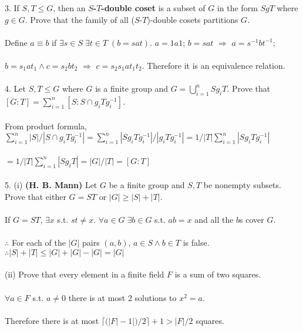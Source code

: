 \documentclass{article}
\begin{document}
\begin{siderules}
\color{blue}3. If \(S,T\le G\), then an \textbf{\(S\)-\(T\)-double coset} is a subset of \(G\) in the form \(SgT\) where \(g\in G\).
Prove that the family of all (\(S\)-\(T\))-double cosets partitions \(G\).\\\\\color{black}
\null\qquad Define \(a\equiv b\) if \(\exists s\in S\;\exists t\in T\;(b=sat)\). \(a=1a1\); \(b=sat\) \(\Longrightarrow\) \(a=s^{-1}bt^{-1}\);\\\\
\null\qquad \(b=s_{1}at_{1}\land c=s_{2}bt_{2}\) \(\Longrightarrow\) \(c=s_{2}s_{1}at_{1}t_{2}\). Therefore it is an equivalence relation.\\\\
\color{blue}4. Let \(S,T\le G\) where \(G\) is a finite group and \(G=\bigcup_{i=1}^{n}Sg_{i}T\). Prove that \([G:T]=\sum_{i=1}^{n}[S:S\cap g_{i}Tg_{i}^{-1}]\).\\\\\color{black}
\null\qquad From product formula, \(\sum_{i=1}^{n}|S|/|S\cap g_{i}Tg_{i}^{-1}|=\sum_{i=1}^{n}|Sg_{i}Tg_{i}^{-1}|/|g_{i}Tg_{i}^{-1}|=1/|T|\sum_{i=1}^{n}|Sg_{i}Tg_{i}^{-1}|\)\\\\
\null\qquad \(=1/|T|\sum_{i=1}^{n}|Sg_{i}T|=|G|/|T|=[G:T]\)\\\\
\color{blue}5. (i) \textbf{(H. B. Mann)} Let \(G\) be a finite group and \(S,T\) be nonempty subsets. Prove that either \(G=ST\) or \(|G|\ge |S|+|T|\).\color{black}\\\\
\null\qquad If \(G=ST\), \(\exists x\) s.t. \(st\neq x\). \(\forall a\in G\;\exists b\in G\) s.t. \(ab=x\) and all the \(b\)s cover \(G\).\\\\
\null\qquad \(\therefore\) For each of the \(|G|\) pairs \((a,b)\), \(a\in S\land b\in T\) is false. \(\therefore |S|+|T|\le|G|+|G|-|G|=|G|\)\\\\
\color{blue}(ii) Prove that every element in a finite field \(F\) is a sum of two squares.\\\\\color{black}
\null\qquad \(\forall a\in F\) s.t. \(a\neq 0\) there is at most 2 solutions to \(x^{2}=a\).\\\\
\null\qquad Therefore there is at most \(\lceil(|F|-1|)/2\rceil+1>|F|/2\) squares.\\\\

\end{siderules}
\end{document}
